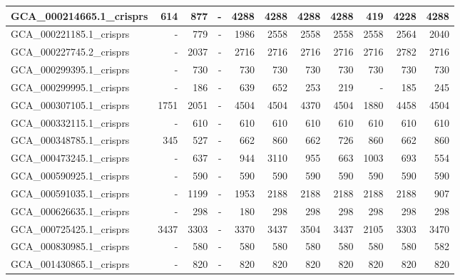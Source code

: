\documentclass[12pt,a4paper]{article}
\begin{document}
\begin{table}[ht]
\begin{center}
\begin{tabular}{|l*{10}{|r}|}
GCA\_000214665.1\_crisprs & 614 & 877 & - & 4288 & 4288 & 4288 & 4288 & 419 & 4228 & 4288 \\ \hline
GCA\_000221185.1\_crisprs & - & 779 & - & 1986 & 2558 & 2558 & 2558 & 2558 & 2564 & 2040 \\ \hline
GCA\_000227745.2\_crisprs & - & 2037 & - & 2716 & 2716 & 2716 & 2716 & 2716 & 2782 & 2716 \\ \hline
GCA\_000299395.1\_crisprs & - & 730 & - & 730 & 730 & 730 & 730 & 730 & 730 & 730 \\ \hline
GCA\_000299995.1\_crisprs & - & 186 & - & 639 & 652 & 253 & 219 & - & 185 & 245 \\ \hline
GCA\_000307105.1\_crisprs & 1751 & 2051 & - & 4504 & 4504 & 4370 & 4504 & 1880 & 4458 & 4504 \\ \hline
GCA\_000332115.1\_crisprs & - & 610 & - & 610 & 610 & 610 & 610 & 610 & 610 & 610 \\ \hline
GCA\_000348785.1\_crisprs & 345 & 527 & - & 662 & 860 & 662 & 726 & 860 & 662 & 860 \\ \hline
GCA\_000473245.1\_crisprs & - & 637 & - & 944 & 3110 & 955 & 663 & 1003 & 693 & 554 \\ \hline
GCA\_000590925.1\_crisprs & - & 590 & - & 590 & 590 & 590 & 590 & 590 & 590 & 590 \\ \hline
GCA\_000591035.1\_crisprs & - & 1199 & - & 1953 & 2188 & 2188 & 2188 & 2188 & 2188 & 907 \\ \hline
GCA\_000626635.1\_crisprs & - & 298 & - & 180 & 298 & 298 & 298 & 298 & 298 & 298 \\ \hline
GCA\_000725425.1\_crisprs & 3437 & 3303 & - & 3370 & 3437 & 3504 & 3437 & 2105 & 3303 & 3470 \\ \hline
GCA\_000830985.1\_crisprs & - & 580 & - & 580 & 580 & 580 & 580 & 580 & 580 & 582 \\ \hline
GCA\_001430865.1\_crisprs & - & 820 & - & 820 & 820 & 820 & 820 & 820 & 820 & 820 \\ \hline
\end{tabular}
\end{center}
\end{table}
\end{document}
